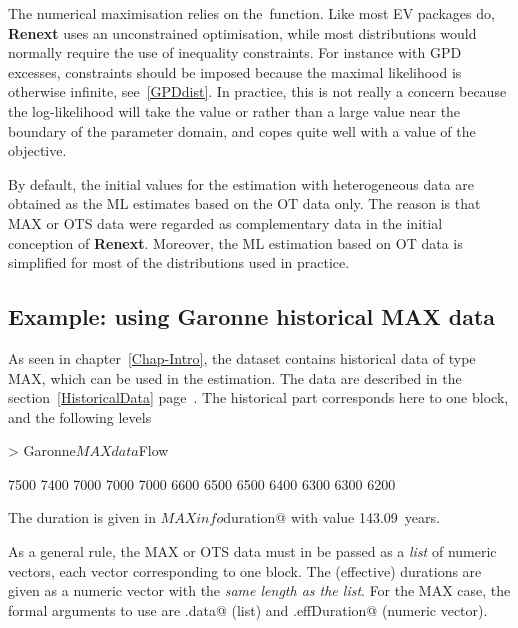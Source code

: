 \documentclass[a4paper]{report}
\newcommand{\pkg}[1]{\textbf{#1}}
\begin{document}
The numerical maximisation relies on the~\verb@optim@ function. Like
most EV packages do, \pkg{Renext} uses an unconstrained optimisation,
while most distributions would normally require the use of inequality
constraints. For instance with GPD excesses, constraints should be
imposed because the maximal likelihood is otherwise infinite,
see~\ref{GPDdist}. In practice, this is not really a concern because
the log-likelihood will take the value \verb@NA@ or \verb@NaN@ rather
than a large value near the boundary of the parameter domain, and
\verb@optim@ copes quite well with a \verb@NA@ value of the objective.

By default, the initial values for the estimation with heterogeneous
data are obtained as the ML estimates based on the OT data only. The
reason is that MAX or OTS data were regarded as complementary
data in the initial conception of \pkg{Renext}. Moreover, the ML
estimation based on OT data is simplified for most of the
distributions used in practice.




\subsection{Example: using Garonne historical MAX data}
As seen in chapter~\ref{Chap-Intro}, the \verb@Garonne@ dataset
contains historical data of type MAX, which can be used in the
estimation. The data are described in the section~\ref{HistoricalData}
page~\pageref{HistoricalData}.  The historical part corresponds here
to one block, and the following levels

\begin{Schunk}
\begin{Sinput}
> Garonne$MAXdata$Flow
\end{Sinput}
\begin{Soutput}
 [1] 7500 7400 7000 7000 7000 6600 6500 6500 6400 6300 6300 6200
\end{Soutput}
\end{Schunk}

\noindent
The duration is given in \verb@Garonne$MAXinfo$duration@
with value 143.09~years.

As a general rule, the MAX or OTS data must in \verb@Renouv@ be passed
as a \textit{list} of numeric vectors, each vector corresponding to
one block. The (effective) durations are given as a numeric vector
with the \textit{same length as the list}. For the MAX case, the
formal arguments to use are \verb@MAX.data@ (list) and
\verb@MAX.effDuration@ (numeric vector).
\end{document}
